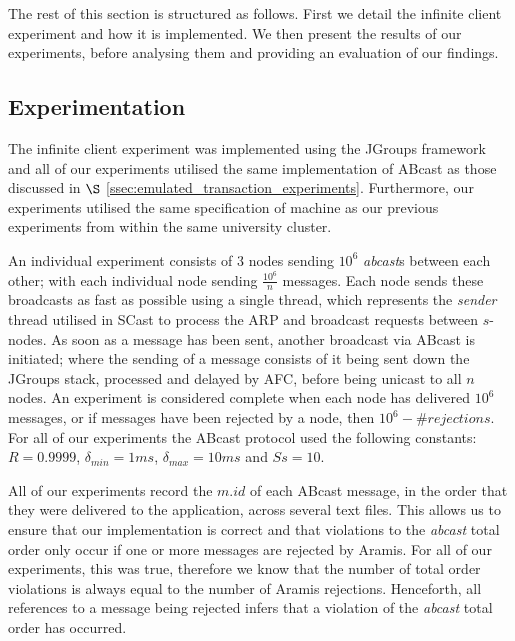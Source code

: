     The rest of this section is structured as follows.  First we detail the infinite client experiment and how it is implemented.  We then present the results of our experiments, before analysing them and providing an evaluation of our findings. 
    
    \subsection{Experimentation}\label{ssec: infinite_experimentation}
    The infinite client experiment was implemented using the JGroups framework and all of our experiments utilised the same implementation of \textsf{ABcast} as those discussed in $\S$ \ref{ssec:emulated_transaction_experiments}.  Furthermore, our experiments utilised the same specification of machine as our previous experiments from within the same university cluster.  
    
    An individual experiment consists of $3$ nodes sending $10^6$ \emph{abcast}s between each other; with each individual node sending $\frac{10^6}{n}$ messages.  Each node sends these broadcasts as fast as possible using a single thread, which represents the \emph{sender} thread utilised in \textsf{SCast} to process the ARP and broadcast requests between $s$-nodes.  As soon as a message has been sent, another broadcast via \textsf{ABcast} is initiated; where the sending of a message consists of it being sent down the JGroups stack, processed and delayed by AFC, before being unicast to all $n$ nodes.  An experiment is considered complete when each node has delivered $10^6$ messages, or if messages have been rejected by a node, then $10^6 - \#rejections$.  For all of our experiments the \textsf{ABcast} protocol used the following constants: $R = 0.9999$, $\delta_{min} = 1ms$, $\delta_{max} = 10ms$ and $Ss = 10$.  
    
    All of our experiments record the $m.id$ of each \textsf{ABcast} message, in the order that they were delivered to the application, across several text files.  This allows us to ensure that our implementation is correct and that violations to the \emph{abcast} total order only occur if one or more messages are rejected by \textsf{Aramis}.  For all of our experiments, this was true, therefore we know that the number of total order violations is always equal to the number of \textsf{Aramis} rejections.  Henceforth, all references to a message being rejected infers that a violation of the \emph{abcast} total order has occurred.  
    
